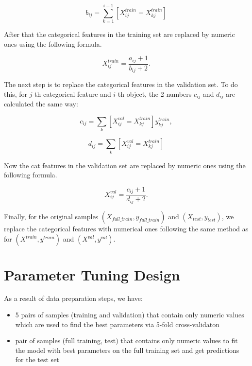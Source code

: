 \documentclass{article}
\begin{document}
$$b_{ij} = \sum_{k=1}^{i - 1}[X^{train}_{ij} = X^{train}_{kj}]$$

After that the categorical features in the training set are replaced by numeric ones using the following formula.


$$X^{train}_{ij} = \frac{a_{ij} + 1}{b_{ij} + 2}.$$



The next step is to replace the categorical features in the validation set. To do this, for $j$-th categorical feature and $i$-th object, the 2 numbers $c_{ij}$ and $d_{ij}$ are calculated the same way:

$$c_{ij} = \sum_{k}[X^{val}_{ij} = X^{train}_{kj}]y^{train}_{kj},$$

$$d_{ij} = \sum_{k}[X^{val}_{ij} = X^{train}_{kj}]$$

Now the cat features in the validation set are replaced by numeric ones using the following formula.


$$X^{val}_{ij} = \frac{c_{ij} + 1}{d_{ij} + 2}.$$



Finally, for the original samples $(X_{full\_train}, y_{full\_train})$ and $(X_{test}, y_{test})$, we replace the categorical features with numerical ones following the same method as for $(X^{train}, y^{train})$ and $(X^{val}, y^{val})$.

\section{Parameter Tuning Design}
As a result of data preparation steps, we have:
\begin{itemize}
\item
5 pairs of samples (training and validation) that contain only numeric values which are used to find the best parameters via 5-fold cross-validaton

\item
pair of samples (full training, test) that contains only numeric values to fit the model with best parameters on the full training set and get predictions for the test set
\end{itemize}
\end{document}
